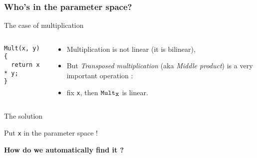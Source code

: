 \documentclass[10pt]{beamer}
\begin{document}
\begin{frame}[fragile]
  \frametitle{Who's in the parameter space?}
  
  \begin{block}{The case of multiplication}
    \begin{columns}
      \begin{column}{0.3\textwidth}
        \begin{center}
          \begin{minipage}{0.7\textwidth}
            \footnotesize
\begin{verbatim}
Mult(x, y) {
  return x * y;
}
\end{verbatim}    
          \end{minipage}
        \end{center}
      \end{column}
      \begin{column}{0.7\textwidth}
        \begin{itemize}
        \item Multiplication \alert{is not linear} (it is bilinear),
        \item But \emph{Transposed multiplication} (aka \emph{Middle
          product}) is a very important operation :
        \item fix \verb|x|, then $\verb|Mult|_{\verb|x|}$ \alert{is linear}.
        \end{itemize}
      \end{column}
    \end{columns}    
  \end{block}

  \begin{block}{The solution}
    \begin{center}
      \Large Put \verb|x| in the parameter space !
    \end{center}
  \end{block}

  \begin{center}
    \textbf{How do we automatically find it ?}
  \end{center}
\end{frame}
\end{document}
